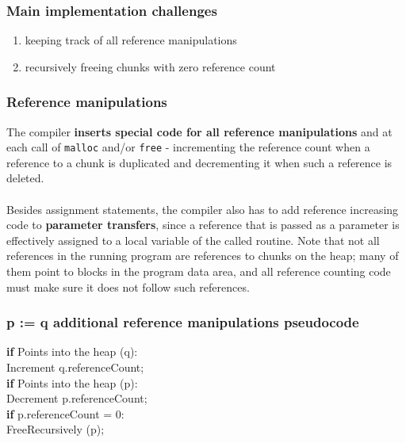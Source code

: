 \documentclass[presentation]{beamer}
\begin{document}
\begin{frame}
  \frametitle{Main implementation challenges}
  \justifying
        \begin{enumerate}
            \item keeping track of all
reference manipulations
            \item  recursively freeing chunks with zero reference count
        \end{enumerate}
\end{frame}

\begin{frame}
    \frametitle{Reference manipulations}
    \justifying
    The compiler \textbf{inserts special code for all reference manipulations} and at each call of \texttt{malloc} and/or \texttt{free} - incrementing
    the reference count when a reference to a chunk is duplicated and decrementing it
    when such a reference is deleted. 
      \\~\\
    Besides assignment statements, the compiler also has to add reference increasing code to \textbf{parameter transfers}, since
    a reference that is passed as a parameter is effectively assigned to a local variable of
    the called routine. Note that not all references in the running program are references to chunks on
    the heap; many of them point to blocks in the program data area, and all reference counting code must make sure it does not follow such references.

  \end{frame}


\begin{frame}
  \frametitle{p := q additional reference manipulations pseudocode}
  \justifying
  \begin{block}{}
  \textbf{if} Points into the heap (q):\\ \hspace*{20pt} Increment q.referenceCount;\\ \textbf{if} Points into the heap (p):\\ \hspace*{20pt} Decrement p.referenceCount;\\ \hspace*{20pt} \textbf{if} p.referenceCount = 0:\\ \hspace*{40pt} FreeRecursively (p);
  \end{block}
\end{frame}  
\end{document}
